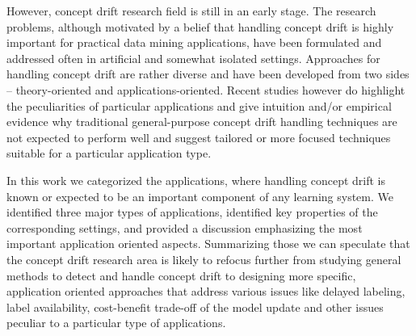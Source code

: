 \documentclass{llncs}
\begin{document}
However, concept drift research field is still in an early stage.
The research problems, although motivated by a belief that handling concept drift is highly
important for practical data mining applications, have been formulated and addressed often in artificial and somewhat isolated settings.
%
Approaches for handling concept drift are rather diverse and have been developed from two sides -- theory-oriented and applications-oriented.
Recent studies however do highlight the peculiarities of particular
applications and give intuition and/or empirical evidence
why traditional general-purpose concept drift handling techniques
are not expected to perform well and suggest tailored or more
focused techniques suitable for a particular application type.


%

In this work we categorized the applications, where handling concept drift is known or expected to be an important component of any learning system.
We identified three major types of applications, identified key properties of the corresponding settings,
and provided a discussion emphasizing the most important application oriented aspects.
Summarizing those we can speculate that the concept drift research area is likely to refocus further from studying general methods to detect and handle concept drift to designing more specific,
application oriented approaches that address various issues like delayed labeling,
label availability, cost-benefit trade-off of the model update and other issues peculiar to a particular type of applications.
\end{document}

